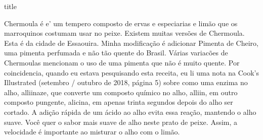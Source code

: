 \documentclass [11pt, papel de carta] {article}
\begin{document}
 {title}

Chermoula é e' um tempero composto de ervas e especiarias e limão que os marroquinos costumam usar no peixe. Existem muitas versões de Chermoula. Esta é da cidade de Essaouira. Minha modificação é adicionar Pimenta de Cheiro, uma pimenta perfumada e não tão quente do Brasil. Várias variacões de Chermoulas mencionam o uso de uma pimenta que não é muito quente. Por coincidencia, quando eu estava pesquisando esta receita, eu li uma nota na Cook's Illustrated (setembro / outubro de 2018, página 5) sobre como uma enzima no alho, alliinaze, que converte um composto químico no alho, alliin, em outro composto pungente, alicina, em apenas trinta segundos depois do alho ser cortado. A adição rápida de um ácido ao alho evita essa reação, mantendo o alho suave. Você quer o sabor mais suave de alho neste prato de peixe. Assim, a velocidade é importante ao misturar o alho com o limão.
\end{document}
